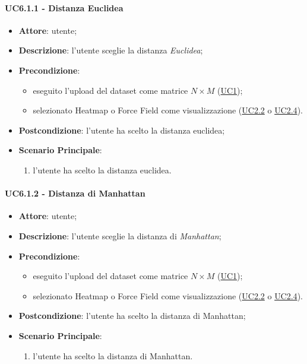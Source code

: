     \paragraph{UC6.1.1 - Distanza Euclidea}
    \label{uc6.1.1}
    \begin{itemize}
    \item \textbf{Attore}: utente;
    \item \textbf{Descrizione}: l'utente sceglie la distanza \emph{Euclidea};
    \item \textbf{Precondizione}: 
    \begin{itemize}
        \item eseguito l'upload del dataset come matrice $N\times M$ (\hyperref[uc1]{UC1});
        \item selezionato Heatmap o Force Field come visualizzazione (\hyperref[uc2.2]{UC2.2} o \hyperref[uc2.4]{UC2.4}).
    \end{itemize}  
    \item \textbf{Postcondizione}: l'utente ha scelto la distanza euclidea;
    \item \textbf{Scenario Principale}: 
    \begin{enumerate}
        \item l'utente ha scelto la distanza euclidea.
    \end{enumerate}
    \end{itemize}
    
    \paragraph{UC6.1.2 - Distanza di Manhattan}
    \label{uc6.1.2}
    \begin{itemize}
    \item \textbf{Attore}: utente;
    \item \textbf{Descrizione}: l'utente sceglie la distanza di \emph{Manhattan};
    \item \textbf{Precondizione}: 
    \begin{itemize}
        \item eseguito l'upload del dataset come matrice $N\times M$ (\hyperref[uc1]{UC1});
        \item selezionato Heatmap o Force Field come visualizzazione (\hyperref[uc2.2]{UC2.2} o \hyperref[uc2.4]{UC2.4}).
    \end{itemize}  
    \item \textbf{Postcondizione}: l'utente ha scelto la distanza di Manhattan;
    \item \textbf{Scenario Principale}: 
    \begin{enumerate}
        \item l'utente ha scelto la distanza di Manhattan.
    \end{enumerate}
    \end{itemize}
